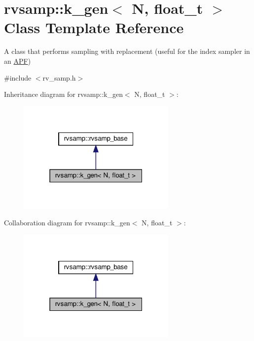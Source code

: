 \hypertarget{classrvsamp_1_1k__gen}{}\section{rvsamp\+:\+:k\+\_\+gen$<$ N, float\+\_\+t $>$ Class Template Reference}
\label{classrvsamp_1_1k__gen}


A class that performs sampling with replacement (useful for the index sampler in an \hyperlink{classAPF}{A\+PF})  




{\ttfamily \#include $<$rv\+\_\+samp.\+h$>$}



Inheritance diagram for rvsamp\+:\+:k\+\_\+gen$<$ N, float\+\_\+t $>$\+:
\nopagebreak
\begin{figure}[H]
\begin{center}
\leavevmode
\includegraphics[width=220pt]{classrvsamp_1_1k__gen__inherit__graph}
\end{center}
\end{figure}


Collaboration diagram for rvsamp\+:\+:k\+\_\+gen$<$ N, float\+\_\+t $>$\+:
\nopagebreak
\begin{figure}[H]
\begin{center}
\leavevmode
\includegraphics[width=220pt]{classrvsamp_1_1k__gen__coll__graph}
\end{center}
\end{figure}
